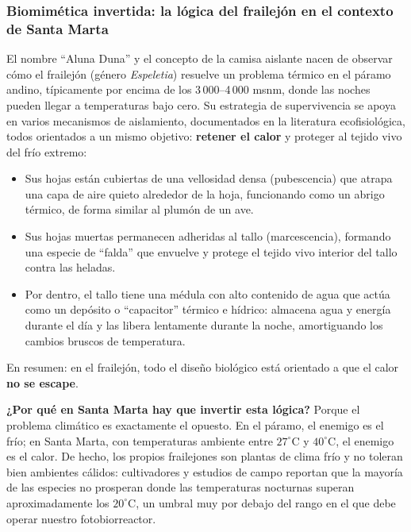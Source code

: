 \documentclass[11pt,a4paper]{article}
\begin{document}
\subsubsection{Biomimética invertida: la lógica del frailejón en el contexto de Santa Marta}
El nombre ``Aluna Duna'' y el concepto de la camisa aislante nacen de observar cómo el frailejón (género \textit{Espeletia}) resuelve un problema térmico en el páramo andino, típicamente por encima de los 3\,000--4\,000 msnm, donde las noches pueden llegar a temperaturas bajo cero. Su estrategia de supervivencia se apoya en varios mecanismos de aislamiento, documentados en la literatura ecofisiológica, todos orientados a un mismo objetivo: \textbf{retener el calor} y proteger al tejido vivo del frío extremo:
\begin{itemize}
    \item Sus hojas están cubiertas de una vellosidad densa (pubescencia) que atrapa una capa de aire quieto alrededor de la hoja, funcionando como un abrigo térmico, de forma similar al plumón de un ave.
    \item Sus hojas muertas permanecen adheridas al tallo (marcescencia), formando una especie de ``falda'' que envuelve y protege el tejido vivo interior del tallo contra las heladas.
    \item Por dentro, el tallo tiene una médula con alto contenido de agua que actúa como un depósito o ``capacitor'' térmico e hídrico: almacena agua y energía durante el día y las libera lentamente durante la noche, amortiguando los cambios bruscos de temperatura.
\end{itemize}
En resumen: en el frailejón, todo el diseño biológico está orientado a que el calor \textbf{no se escape}.

\textbf{¿Por qué en Santa Marta hay que invertir esta lógica?} Porque el problema climático es exactamente el opuesto. En el páramo, el enemigo es el frío; en Santa Marta, con temperaturas ambiente entre $27^\circ$C y $40^\circ$C, el enemigo es el calor. De hecho, los propios frailejones son plantas de clima frío y no toleran bien ambientes cálidos: cultivadores y estudios de campo reportan que la mayoría de las especies no prosperan donde las temperaturas nocturnas superan aproximadamente los $20^\circ$C, un umbral muy por debajo del rango en el que debe operar nuestro fotobiorreactor.
\end{document}

